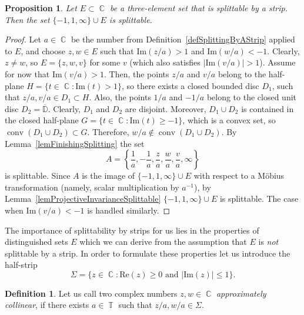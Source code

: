 \documentclass{amsart}
\numberwithin{equation}{section}
\newtheorem{proposition}[theorem]{Proposition}
\theoremstyle{definition}
\newtheorem{definition}[theorem]{Definition}
\theoremstyle{remark}
\DeclareMathOperator{\conv}{conv}
\DeclareMathOperator{\CC}{\mathbb C}
\DeclareMathOperator{\TT}{\mathbb T}
\begin{document}
	\begin{proposition}\label{propSplittingIfAsterisk}
		Let $E \subset \CC$ be a three-element set that is splittable by a strip. Then the set $\{-1, 1, \infty\} \cup E$ is splittable.
	\end{proposition}
	\begin{proof}
		Let $a \in \CC$ be the number from Definition~\ref{defSplittingByAStrip} applied to $E$, and choose $z, w \in E$ such that $\mathrm{Im}(z/a) > 1$ and $\mathrm{Im}(w/a) < -1$. Clearly, $z \ne w$, so $E = \{z, w, v\}$ for some $v$ (which also satisfies $|\mathrm{Im}(v/a)| > 1$). Assume for now that $\mathrm{Im}(v/a) > 1$. Then, the points $z/a$ and $v/a$ belong to the half-plane $H = \{t \in \CC: \mathrm{Im}(t) > 1\}$, so there exists a closed bounded disc $D_1$, such that $z/a, v/a \in D_1 \subset H$. Also, the points $1/a$ and $-1/a$ belong to the closed unit disc $D_2 = \overline{\mathbb D}$. Clearly, $D_1$ and $D_2$ are disjoint. Moreover, $D_1 \cup D_2$ is contained in the closed half-plane $G = \{t \in \CC: \mathrm{Im}(t) \ge -1\}$, which is a convex set, so $\conv(D_1 \cup D_2) \subset G$. Therefore, $w/a \notin \conv(D_1 \cup D_2)$. By Lemma~\ref{lemFinishingSplitting} the set 
		\[
		A = \left\{\dfrac{1}{a}, -\dfrac{1}{a}, \dfrac{z}{a}, \dfrac{w}{a}, \dfrac{v}{a}, \infty\right\}
		\]
		is splittable. Since $A$ is the image of $\{-1, 1, \infty\} \cup E$ with respect to a M\"obius transformation (namely, scalar multiplication by $a^{-1}$), by Lemma~\ref{lemProjectiveInvarianceSplittable} $\{-1, 1, \infty\} \cup E$ is splittable. The case when $\mathrm{Im}(v/a) < -1$ is handled similarly.
	\end{proof}
	
	The importance of splittability by strips for us lies in the properties of distinguished sets $E$ which we can derive from the assumption that $E$ is {\it{not}} splittable by a strip. In order to formulate these properties let us introduce the half-strip
	\[
	\Sigma = \{z \in \CC: \mathrm{Re}(z) \ge 0 \text{ and } |\mathrm{Im}(z)| \le 1\}.
	\]
	\begin{definition}
		Let us call two complex numbers $z,w \in \CC$ {\it{approximately collinear}}, if there exists $a \in \TT$ such that $z/a, w/a \in \Sigma$.
	\end{definition}
	
\end{document}
